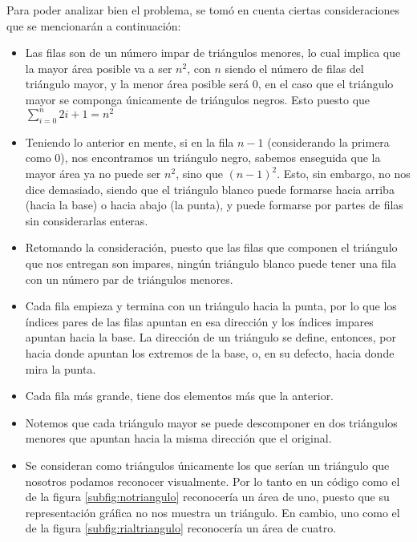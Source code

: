 \documentclass[letterpaper]{article}
\begin{document}
  Para poder analizar bien el problema, se tom\'o en cuenta ciertas
  consideraciones que se mencionar\'an a continuaci\'on:
    \begin{itemize}
    \item Las filas son de un n\'umero impar de tri\'angulos menores,
    lo cual implica que la mayor \'area posible va a ser \(n^2\), con \(n\) siendo el
    n\'umero de filas del tri\'angulo mayor, y la menor \'area posible ser\'a 0,
    en el caso que el tri\'angulo mayor se componga \'unicamente de tri\'angulos
    negros. Esto puesto que $\sum_{i=0}^{n} 2{i}+1 = {n}^2$
    \item Teniendo lo anterior en mente, si en la fila \(n-1\) (considerando la
    primera como 0), nos encontramos un tri\'angulo negro, sabemos enseguida
    que la mayor \'area ya no puede ser \({n}^2\), sino que \({(n-1)}^2\). Esto, sin embargo,
    no nos dice demasiado, siendo que el tri\'angulo blanco puede formarse hacia
    arriba (hacia la base) o hacia abajo (la punta), y puede formarse por
    partes de filas sin considerarlas enteras.
    \item Retomando la consideraci\'on, puesto que las filas que componen el
    tri\'angulo que nos entregan son impares, ning\'un tri\'angulo blanco puede tener
    una fila con un n\'umero par de tri\'angulos menores.
    \item Cada fila empieza y termina con un tri\'angulo hacia la punta, por lo
    que los \'indices pares de las filas apuntan en esa direcci\'on y
    los \'indices impares apuntan hacia la base. La direcci\'on de un tri\'angulo
    se define, entonces, por hacia donde apuntan los extremos de la base, o,
    en su defecto, hacia donde mira la punta.
    \item Cada fila m\'as grande, tiene dos elementos m\'as que la
    anterior.
    \item Notemos que cada tri\'angulo mayor se puede descomponer en dos tri\'angulos
    menores que apuntan hacia la misma direcci\'on que el original.
    \item Se consideran como tri\'angulos \'unicamente los que ser\'ian un
    tri\'angulo que nosotros podamos reconocer visualmente. Por
    lo tanto en un c\'odigo como el de la figura \ref{subfig:notriangulo} reconocer\'ia un
    \'area de uno, puesto que su representaci\'on gr\'afica no nos
    muestra un tri\'angulo. En cambio, uno como el de la figura \ref{subfig:rialtriangulo}
    reconocer\'ia un \'area de cuatro.
    \end{itemize}
\end{document}
